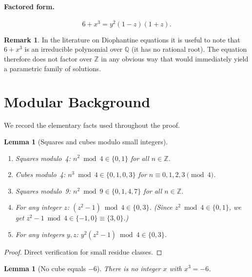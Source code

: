 \documentclass[12pt,a4paper]{article}
\newtheorem{lemma}[theorem]{Lemma}
\theoremstyle{definition}
\newtheorem{remark}[theorem]{Remark}
\newcommand{\Z}{\mathbb{Z}}
\newcommand{\Q}{\mathbb{Q}}
\begin{document}
\paragraph{Factored form.}
\[
  6 + x^3 = y^2(1-z)(1+z).
\]

\begin{remark}
  In the literature on Diophantine equations it is useful to note that $6 + x^3$
  is an irreducible polynomial over $\Q$ (it has no rational root).
  The equation therefore does not factor over $\Z$ in any obvious way
  that would immediately yield a parametric family of solutions.
\end{remark}

\section{Modular Background}

We record the elementary facts used throughout the proof.

\begin{lemma}[Squares and cubes modulo small integers]\label{lem:modular-facts}
\hfill
\begin{enumerate}[label=(\roman*)]
  \item\label{it:sq4} Squares modulo~4: $n^2 \bmod 4 \in \{0,1\}$ for all $n \in \Z$.
  \item\label{it:cu4} Cubes modulo~4: $n^3 \bmod 4 \in \{0,1,0,3\}$ for
        $n \equiv 0,1,2,3 \pmod 4$.
  \item\label{it:sq9} Squares modulo~9: $n^2 \bmod 9 \in \{0,1,4,7\}$ for all $n \in \Z$.
  \item\label{it:z2m1-4} For any integer $z$:
        $(z^2-1) \bmod 4 \in \{0,3\}$.
        (Since $z^2 \bmod 4 \in \{0,1\}$, we get $z^2-1 \bmod 4 \in \{-1,0\} \equiv \{3,0\}$.)
  \item\label{it:prod4} For any integers $y, z$:
        $y^2(z^2-1) \bmod 4 \in \{0,3\}$.
\end{enumerate}
\end{lemma}

\begin{proof}
  Direct verification for small residue classes.
\end{proof}

\begin{lemma}[No cube equals $-6$]\label{lem:no-cube}
  There is no integer $x$ with $x^3 = -6$.
\end{lemma}
\end{document}
